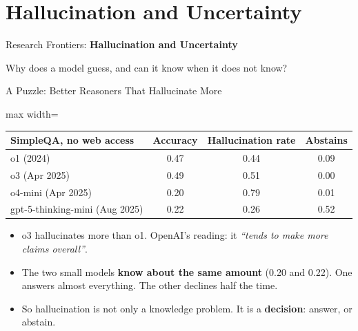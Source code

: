 \section{Hallucination and Uncertainty}

\begin{frame}{}
    \LARGE Research Frontiers: \textbf{Hallucination and Uncertainty}

    \vspace{1em}
    \normalsize Why does a model guess, and can it know when it does not know?
\end{frame}

\begin{frame}{A Puzzle: Better Reasoners That Hallucinate More}
    \begin{center}
    \small
    \begin{adjustbox}{max width=\linewidth}\begin{tabular}{lccc}
        \toprule
        \textbf{SimpleQA, no web access} & \textbf{Accuracy} & \textbf{Hallucination rate} & \textbf{Abstains} \\
        \midrule
        o1 (2024) & 0.47 & 0.44 & 0.09 \\
        o3 (Apr 2025) & 0.49 & 0.51 & 0.00 \\
        \rowcolor{KAred!10} o4-mini (Apr 2025) & 0.20 & 0.79 & 0.01 \\
        \rowcolor{KAUSTcyan!12} gpt-5-thinking-mini (Aug 2025) & 0.22 & 0.26 & 0.52 \\
        \bottomrule
    \end{tabular}\end{adjustbox}
    \end{center}
    \begin{itemize}\itemsep0.45em
        \item o3 hallucinates more than o1. OpenAI's reading: it \emph{``tends to make more claims overall''}.
        \item The two small models \textbf{know about the same amount} (0.20 and 0.22). One answers almost everything. The other declines half the time.
        \item So hallucination is not only a knowledge problem. It is a \textbf{decision}: answer, or abstain.
    \end{itemize}
    \vspace{0.2em}
\end{frame}

